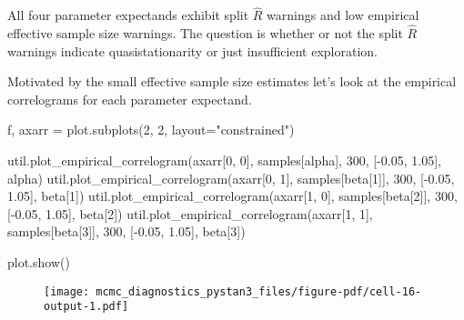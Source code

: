 \documentclass[
  letterpaper,
  DIV=11,
  numbers=noendperiod]{scrartcl}
\newenvironment{Shaded}{\begin{snugshade}}{\end{snugshade}}
\newcommand{\DecValTok}[1]{\textcolor[rgb]{0.68,0.00,0.00}{#1}}
\newcommand{\FloatTok}[1]{\textcolor[rgb]{0.68,0.00,0.00}{#1}}
\newcommand{\NormalTok}[1]{\textcolor[rgb]{0.00,0.23,0.31}{#1}}
\newcommand{\OperatorTok}[1]{\textcolor[rgb]{0.37,0.37,0.37}{#1}}
\newcommand{\StringTok}[1]{\textcolor[rgb]{0.13,0.47,0.30}{#1}}
\begin{document}
All four parameter expectands exhibit split \(\hat{R}\) warnings and low
empirical effective sample size warnings. The question is whether or not
the split \(\hat{R}\) warnings indicate quasistationarity or just
insufficient exploration.

Motivated by the small effective sample size estimates let's look at the
empirical correlograms for each parameter expectand.

\begin{Shaded}
\begin{Highlighting}[]
\NormalTok{f, axarr }\OperatorTok{=}\NormalTok{ plot.subplots(}\DecValTok{2}\NormalTok{, }\DecValTok{2}\NormalTok{, layout}\OperatorTok{=}\StringTok{"constrained"}\NormalTok{)}

\NormalTok{util.plot\_empirical\_correlogram(axarr[}\DecValTok{0}\NormalTok{, }\DecValTok{0}\NormalTok{], samples[}\StringTok{\textquotesingle{}alpha\textquotesingle{}}\NormalTok{], }
                                \DecValTok{300}\NormalTok{, [}\OperatorTok{{-}}\FloatTok{0.05}\NormalTok{, }\FloatTok{1.05}\NormalTok{],  }\StringTok{\textquotesingle{}alpha\textquotesingle{}}\NormalTok{)}
\NormalTok{util.plot\_empirical\_correlogram(axarr[}\DecValTok{0}\NormalTok{, }\DecValTok{1}\NormalTok{], samples[}\StringTok{\textquotesingle{}beta[1]\textquotesingle{}}\NormalTok{], }
                                \DecValTok{300}\NormalTok{, [}\OperatorTok{{-}}\FloatTok{0.05}\NormalTok{, }\FloatTok{1.05}\NormalTok{],  }\StringTok{\textquotesingle{}beta[1]\textquotesingle{}}\NormalTok{)}
\NormalTok{util.plot\_empirical\_correlogram(axarr[}\DecValTok{1}\NormalTok{, }\DecValTok{0}\NormalTok{], samples[}\StringTok{\textquotesingle{}beta[2]\textquotesingle{}}\NormalTok{], }
                                \DecValTok{300}\NormalTok{, [}\OperatorTok{{-}}\FloatTok{0.05}\NormalTok{, }\FloatTok{1.05}\NormalTok{],  }\StringTok{\textquotesingle{}beta[2]\textquotesingle{}}\NormalTok{)}
\NormalTok{util.plot\_empirical\_correlogram(axarr[}\DecValTok{1}\NormalTok{, }\DecValTok{1}\NormalTok{], samples[}\StringTok{\textquotesingle{}beta[3]\textquotesingle{}}\NormalTok{], }
                                \DecValTok{300}\NormalTok{, [}\OperatorTok{{-}}\FloatTok{0.05}\NormalTok{, }\FloatTok{1.05}\NormalTok{],  }\StringTok{\textquotesingle{}beta[3]\textquotesingle{}}\NormalTok{)}

\NormalTok{plot.show()}
\end{Highlighting}
\end{Shaded}

\begin{figure}[H]

{\centering \texttt{[image: mcmc\_diagnostics\_pystan3\_files/figure-pdf/cell-16-output-1.pdf]}

}

\end{figure}
\end{document}
